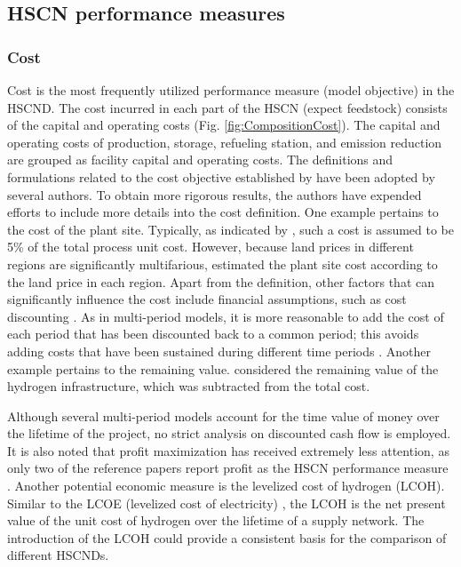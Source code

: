 \documentclass[11pt,3p]{elsarticle}
\begin{document}
\subsection{HSCN performance measures}
\label{sec:performance}

\subsubsection{Cost}

Cost is the most frequently utilized performance measure (model objective) in the HSCND. The cost incurred in each part of the HSCN (expect feedstock) consists of the capital and operating costs (Fig. \ref{fig:CompositionCost}). The capital and operating costs of production, storage, refueling station, and emission reduction are grouped as facility capital and operating costs. The definitions and formulations related to the cost objective established by \citet{almansoori2006design} have been adopted by several authors. To obtain more rigorous results, the authors have expended efforts to include more details into the cost definition. One example pertains to the cost of the plant site. Typically, as indicated by \citet{kim2008optimization}, such a cost is assumed to be 5\% of the total process unit cost. However, because land prices in different regions are significantly multifarious, \citet{han2012modeling,kim2008optimization,kim2016optimization} estimated the plant site cost according to the land price in each region. Apart from the definition, other factors that can significantly influence the cost include financial assumptions, such as cost discounting \citep{konda2011optimal}. As in multi-period models, it is more reasonable to add the cost of each period that has been discounted back to a common period; this avoids adding costs that have been sustained during different time periods \citep{dagdougui2012models}. Another example pertains to the remaining value. \citet{agnolucci2013importance} considered the remaining value of the hydrogen infrastructure, which was subtracted from the total cost.

Although several multi-period models account for the time value of money over the lifetime of the project, no strict analysis on discounted cash flow is employed. It is also noted that profit maximization has received extremely less attention, as only two of the reference papers report profit as the HSCN performance measure \citep{parker2010waste,han2012modeling}. Another potential economic measure is the levelized cost of hydrogen (LCOH). Similar to the LCOE (levelized cost of electricity) \citep{wiki:LCOE}, the LCOH is the net present value of the unit cost of hydrogen over the lifetime of a supply network. The introduction of the LCOH could provide a consistent basis for the comparison of different HSCNDs.
\end{document}
